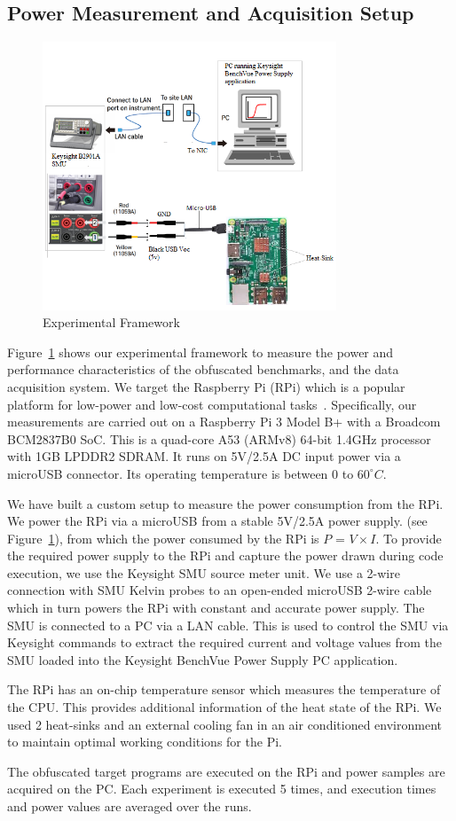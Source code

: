 \subsection{Power Measurement and Acquisition Setup}
\begin{figure}[t]
  \centering
\includegraphics[width=0.9\columnwidth, height=8cm]{expsetup}
  \caption{Experimental Framework}\label{expsetup}
\end{figure}

Figure~\ref{expsetup} shows our experimental framework to measure the power and performance characteristics of the obfuscated benchmarks, and the data acquisition system. We target the Raspberry Pi (RPi) which is a popular platform for low-power and low-cost computational tasks~\cite{maksimovic2014raspberry}. Specifically, our measurements are carried out on a Raspberry Pi 3 Model B+ with a Broadcom BCM2837B0 SoC. This is a quad-core A53 (ARMv8) 64-bit 1.4GHz processor with 1GB LPDDR2 SDRAM. It runs on 5V/2.5A DC input power via a microUSB connector. Its operating temperature is between 0 to $60^{\circ}C$.

We have built a custom setup to measure the power consumption from the RPi. We power the RPi via a microUSB from a stable 5V/2.5A power supply. (see Figure~\ref{expsetup}), from which the power consumed by the RPi is $P$ = $V\times I$.
To provide the required power supply to the RPi and capture the power drawn during code execution, we  use the Keysight SMU source meter unit. We use a 2-wire connection with SMU Kelvin probes to an open-ended microUSB 2-wire cable which in turn powers the RPi with constant and accurate power supply. The SMU is connected to a PC via a LAN cable. This is used to control the SMU via Keysight commands to extract the required current and voltage values from the SMU loaded into the Keysight BenchVue Power Supply PC application.

The RPi has an on-chip temperature sensor which measures the temperature of the CPU. This provides additional information of the heat state of the RPi. We used 2 heat-sinks and an external cooling fan in an air conditioned environment to maintain optimal working conditions for the Pi.  

The obfuscated target programs are executed on the RPi and power samples are acquired on the PC. Each experiment is executed 5 times, and execution times and power values are averaged over the runs.